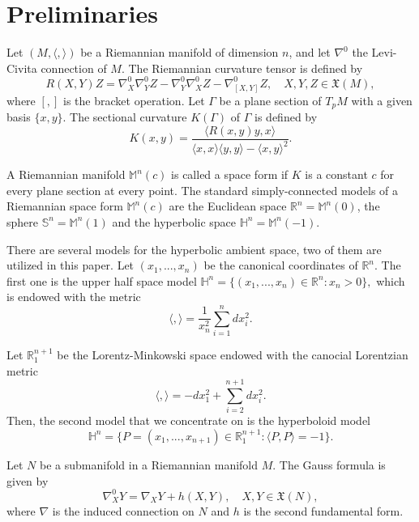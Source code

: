 \documentclass[12pt]{amsart}
\def\r{\mathbb R}
\def\m{\mathbb M}
\def\s{\mathbb S}
\def\h{\mathbb H}
\theoremstyle{definition}
\begin{document}
\section{Preliminaries} \label{pre}


Let $(M, \langle , \rangle) $ be a Riemannian manifold of dimension $n$, and let $\nabla^0$ the Levi-Civita connection of $M$. The Riemannian curvature tensor is defined by%
\begin{equation*}
R( X,Y) Z=\nabla^0_X\nabla^0_YZ-\nabla^0_Y\nabla^0_XZ-\nabla^0_{\left[ X,Y\right] }Z, \quad X,Y,Z \in \mathfrak{X}(M),
\end{equation*}
where $[ ,]$ is the bracket operation. Let $\Gamma $ be a plane section of $T_{p}M$ with a given basis $\{ x,y\}$. The sectional curvature $K( \Gamma ) $ of $\Gamma $ is defined by
\begin{equation*}
K( x,y) =\frac{\langle R( x,y) y,x \rangle }{\langle x,x \rangle \langle y,y\rangle -\langle x,y \rangle ^2}.
\end{equation*}

A Riemannian manifold $\m^n(c)$ is called a space form if $K$ is a constant $c$ for every plane section at every point. The standard simply-connected models of a Riemannian space form $\m^n(c)$ are the Euclidean space $\r^n=\m^n(0)$, the sphere $\s^n=\m^n(1)$ and the hyperbolic space $\h^n=\m^n(-1)$.

There are several models for the hyperbolic ambient space, two of them are utilized in this paper. Let $(x_1,...,x_n)$ be the canonical coordinates of $\r^n$. The first one is the upper half space model $\h^n=\{(x_1,...,x_n) \in \r^n : x_n>0\},$ which is endowed with the metric
\begin{equation*}
\langle ,\rangle =\frac{1}{x_n^2}\sum_{i=1}^{n}dx_i^2.
\end{equation*}

Let $\r_1^{n+1}$ be the Lorentz-Minkowski space endowed with the canocial Lorentzian metric    
\begin{equation*}
\langle ,\rangle =-dx_1^2+\sum_{i=2}^{n+1}dx_i^2.
\end{equation*}
Then, the second model that we concentrate on is the hyperboloid model 
\begin{equation*}
\h^n=\{P=(x_1,...,x_{n+1}) \in \r_1^{n+1} : \langle P,P \rangle=-1\}.
\end{equation*} 
 

Let $N$ be a submanifold in a Riemannian manifold $M$. The Gauss formula is given by
\begin{equation*}
\nabla^0_XY=\nabla_XY+h(X,Y), \quad X,Y\in \mathfrak{X}(N),
\end{equation*}
where $\nabla$ is the induced connection on $N$ and $h$ is the second fundamental form. %
\end{document}
